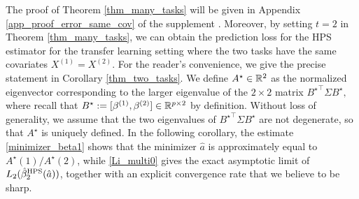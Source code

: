 The proof of Theorem \ref{thm_many_tasks} will be given in Appendix  \ref{app_proof_error_same_cov} of the supplement \cite{MTL_suppl}. Moreover, by setting $t=2$ in Theorem \ref{thm_many_tasks}, we can obtain the prediction loss for the HPS estimator for the transfer learning setting where the two tasks have the same covariates  $X^{(1)}=X^{(2)}$. For the reader's convenience, we give the precise statement in Corollary \ref{thm_two_tasks}.
We define $A^\star \in \mathbb{R}^{2}$ as the normalized eigenvector corresponding to the larger eigenvalue of the $2\times 2$ matrix
$ {B^\star}^\top \Sigma  B^\star,$ where recall that $B^\star := [{\beta}^{(1)},{\beta}^{(2)}] \in \mathbb{R}^{p\times 2}$ by definition.
Without loss of generality, we assume that the two eigenvalues of ${B^\star}^\top \Sigma B^\star$ are not degenerate, so that $A^\star$ is uniquely defined. %
In the following corollary, the estimate \eqref{minimizer_beta1} shows that the minimizer $\hat a$ is approximately equal to $A^\star(1)/A^\star(2)$, while \eqref{Li_multi0} gives the exact asymptotic limit of $L_2(\hat{\beta}_2^{\textup{HPS}}(\hat a)) $, together with an explicit convergence rate that we believe to be sharp.

